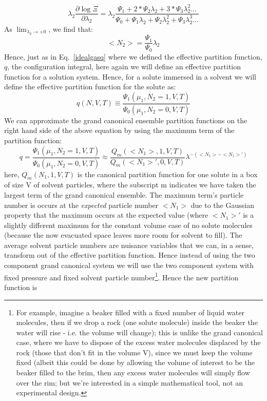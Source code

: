\begin{equation}\label{}
  \lambda_{2}  \frac{\partial\log \Xi}{\partial \lambda_{2}} = \lambda_{2} \frac{\Psi_1 + 2* \Psi_2 \lambda_{2} +3*\Psi_3 \lambda_{2}^2 \dots  }{\Psi_0 + \Psi_1 \lambda_{2} +  \Psi_2 \lambda_{2}^2 +\Psi_3 \lambda_{2}^3 \dots }
\end{equation}
As $\lim_{\lambda_{2} \to +0}$, we find that:
\begin{equation}\label{averageN}
  < N_2 > = \frac{ \Psi_1}{\Psi_0} \lambda_2
\end{equation}
Hence, just as in Eq.~\ref{idealgasq} where we defined the effective partition function, $q$, the configuration integral, here again we will define an effective partition function for a solution system.  Hence, for a solute immersed in a solvent we will define the effective partition function for the solute as:
\begin{equation}\label{qref}
  q(N,V,T) \equiv \frac{ \Psi_1(\mu_1,N_2=1,V,T) }{\Psi_0(\mu_1,N_2=0,V,T)}
\end{equation}
We can approximate the grand canonical ensemble partition functions on the right hand side of the above equation by using the maximum term of the partition function:
\begin{equation}\label{solvent}
  q= \frac{ \Psi_1(\mu_1,N_2=1,V,T) }{\Psi_0(\mu_1,N_2=0,V,T)} \approx \frac{Q_m(<N_1>,1,V,T)}{Q_m(<N_1>',0,V,T)}\lambda^{-(<N_1> - <N_1>')}
\end{equation}
here, $Q_m(N_1,1,V,T)$ is the canonical partition function for one solute in a box of size V of solvent particles, where the subscript m indicates we have taken the largest term of the grand canonical ensemble.  The maximum term's particle number is occurs at the \textit{expected} particle number $<N_1>$ due to the Gaussian property that the maximum occurs at the expected value (where $<N_1>'$ is a slightly different maximum for the constant volume case of no solute molecules (because the now evacuated space leaves more room for solvent to fill).  The average solvent particle numbers are nuisance variables that we can, in a sense, transform out of the effective partition function.  Hence instead of using the two component grand canonical system we will use the two component system with fixed pressure and fixed solvent particle number\footnote{For example, imagine a beaker filled with a fixed number of liquid water molecules, then if we drop a rock (one solute molecule) inside the beaker the water will rise - i.e. the volume will change); this is unlike the grand canonical case, where we have to dispose of the excess water molecules displaced by the rock (those that don't fit in the volume V), since we must keep the volume fixed (albeit this could be done by allowing the volume of interest to be the beaker filled to the brim, then any excess water molecules will simply flow over the rim; but we're interested in a simple mathematical tool, not an experimental design.}.  Hence the new partition function is  
